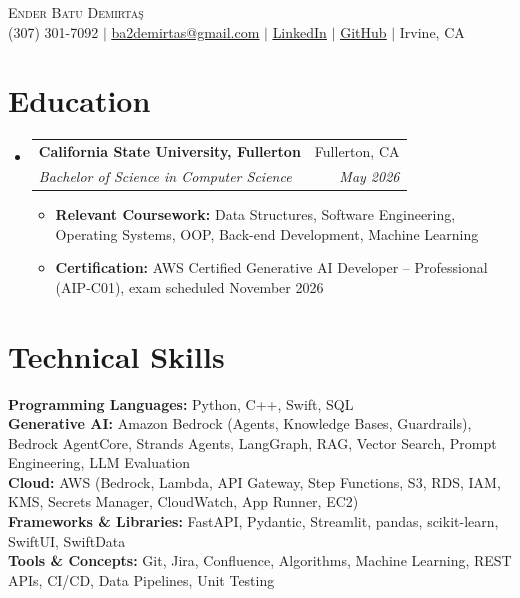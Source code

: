 \documentclass[letterpaper,11pt]{article}
\makeatletter
\newcommand{\resumeItem}[1]{
  \item\small{{#1 \vspace{-3pt}}}
}
\newcommand{\resumeSubheading}[4]{
  \vspace{-5pt}\item
    \begin{tabular*}{0.97\textwidth}[t]{l@{\extracolsep{\fill}}r}
      \textbf{#1} & #2 \\
      \textit{\small#3} & \textit{\small #4} \\
    \end{tabular*}\vspace{-9pt}
}
\newcommand{\resumeSubHeadingListStart}{\begin{itemize}[leftmargin=0.15in, label={}]}
\newcommand{\resumeSubHeadingListEnd}{\end{itemize}}
\newcommand{\resumeItemListStart}{\begin{itemize}}
\newcommand{\resumeItemListEnd}{\end{itemize}\vspace{-7pt}}
\makeatother
\begin{document}
\begin{center}
    {\Huge \scshape Ender Batu Demirta\c{s}} \\ \vspace{4pt}
    \small
    (307) 301-7092 $|$
    \href{mailto:ba2demirtas@gmail.com}{\underline{ba2demirtas@gmail.com}} $|$
    \href{https://linkedin.com/in/batu-demirtas-ba83812ba/}{\underline{LinkedIn}} $|$
    \href{https://github.com/Batu-end}{\underline{GitHub}} $|$
    Irvine, CA
\end{center}

\section{Education}
\resumeSubHeadingListStart
  \resumeSubheading
    {California State University, Fullerton}{Fullerton, CA}
    {Bachelor of Science in Computer Science}{May 2026}
    \resumeItemListStart
      \resumeItem{\textbf{Relevant Coursework:} Data Structures, Software Engineering, Operating Systems, OOP, Back-end Development, Machine Learning}
      \resumeItem{\textbf{Certification:} AWS Certified Generative AI Developer -- Professional (AIP-C01), exam scheduled November 2026}
    \resumeItemListEnd
\resumeSubHeadingListEnd

\section{Technical Skills}
\begin{itemize}[leftmargin=0.15in, label={}]
  \small{\item{
    \textbf{Programming Languages:}{ Python, C++, Swift, SQL} \\
    \textbf{Generative AI:}{ Amazon Bedrock (Agents, Knowledge Bases, Guardrails), Bedrock AgentCore, Strands Agents, LangGraph, RAG, Vector Search, Prompt Engineering, LLM Evaluation} \\
    \textbf{Cloud:}{ AWS (Bedrock, Lambda, API Gateway, Step Functions, S3, RDS, IAM, KMS, Secrets Manager, CloudWatch, App Runner, EC2)} \\
    \textbf{Frameworks \& Libraries:}{ FastAPI, Pydantic, Streamlit, pandas, scikit-learn, SwiftUI, SwiftData} \\
    \textbf{Tools \& Concepts:}{ Git, Jira, Confluence, Algorithms, Machine Learning, REST APIs, CI/CD, Data Pipelines, Unit Testing}
  }}
\end{itemize}
\end{document}
